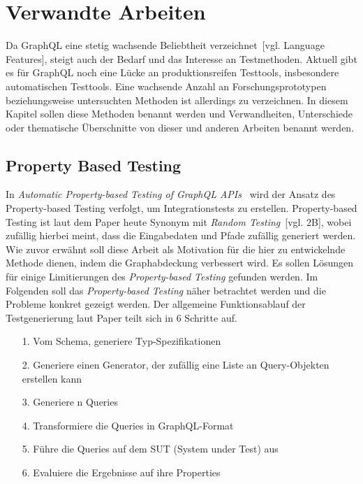 \chapter{Verwandte Arbeiten}
\label{relatedWork}

Da GraphQL eine stetig wachsende Beliebtheit verzeichnet~\cite{graphql-growing-report}[vgl. Language Features], steigt auch der Bedarf und das Interesse an Testmethoden.
Aktuell gibt es für GraphQL noch eine Lücke an produktionsreifen Testtools, insbesondere automatischen Testtools.
Eine wachsende Anzahl an Forschungsprototypen beziehungsweise untersuchten Methoden ist allerdings zu verzeichnen.
In diesem Kapitel sollen diese Methoden benannt werden und Verwandheiten, Unterschiede oder thematische Überschnitte von dieser und anderen Arbeiten benannt werden.

\section{Property Based Testing}

In \textit{Automatic Property-based Testing of GraphQL APIs}~\cite{property-based-testing} wird der Ansatz des Property-based Testing verfolgt, um Integrationstests zu erstellen.
Property-based Testing ist laut dem Paper heute Synonym mit \textit{Random Testing}~\cite{property-based-testing}[vgl. 2B], wobei zufällig hierbei meint, dass die Eingabedaten und Pfade zufällig generiert werden.
Wie zuvor erwähnt soll diese Arbeit als Motivation für die hier zu entwickelnde Methode dienen, indem die Graphabdeckung verbessert wird.
Es sollen Lösungen für einige Limitierungen des \textit{Property-based Testing} gefunden werden.
Im Folgenden soll das \textit{Property-based Testing} näher betrachtet werden und die Probleme konkret gezeigt werden.
Der allgemeine Funktionsablauf der Testgenerierung laut Paper teilt sich in 6 Schritte auf.

\begin{center}
    \begin{itemize}
        \item[1.] Vom Schema, generiere Typ-Spezifikationen
        \item[2.] Generiere einen Generator, der zufällig eine Liste an Query-Objekten erstellen kann
        \item[3.] Generiere n Queries
        \item[4.] Transformiere die Queries in GraphQL-Format
        \item[5.] Führe die Queries auf dem SUT (System under Test) aus
        \item[6.] Evaluiere die Ergebnisse auf ihre Properties
    \end{itemize}{\cite[vgl. 3. Proposed Method]{property-based-testing}}
\end{center}

